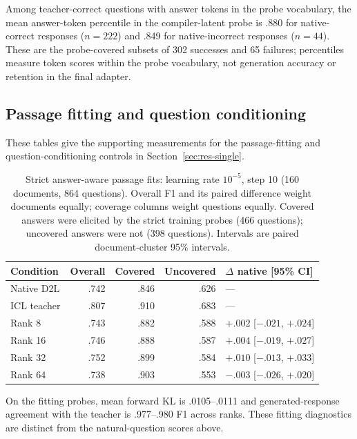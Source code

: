 Among teacher-correct questions with answer tokens in the probe vocabulary,
the mean answer-token percentile in the compiler-latent probe is .880 for
native-correct responses ($n=222$) and .849 for native-incorrect responses
($n=44$). These are the probe-covered subsets of 302 successes and 65 failures;
percentiles measure token scores within the probe vocabulary, not generation
accuracy or retention in the final adapter.

\subsection{Passage fitting and question conditioning}
\label{sec:res-refinement}
These tables give the supporting measurements for the passage-fitting and
question-conditioning controls in Section~\ref{sec:res-single}.

\begin{table}[t]
\centering
\caption{Strict answer-aware passage fits: learning rate $10^{-5}$, step 10
(160 documents, 864 questions). Overall F1 and its paired difference weight
documents equally; coverage columns weight questions equally. Covered answers
were elicited by the strict training probes (466 questions); uncovered answers
were not (398 questions). Intervals are paired document-cluster 95\% intervals.}
\label{tab:refinement}
\scriptsize\setlength{\tabcolsep}{2pt}
\begin{tabular}{@{}lrrrl@{}}
\toprule
Condition & Overall & Covered & Uncovered & $\Delta$ native [95\% CI] \\
\midrule
Native D2L & .742 & .846 & .626 & --- \\
ICL teacher & .807 & .910 & .683 & --- \\
\midrule
Rank 8 & .743 & .882 & .588 & $+.002$ [$-.021$, $+.024$] \\
Rank 16 & .746 & .888 & .587 & $+.004$ [$-.019$, $+.027$] \\
Rank 32 & .752 & .899 & .584 & $+.010$ [$-.013$, $+.033$] \\
Rank 64 & .738 & .903 & .553 & $-.003$ [$-.026$, $+.020$] \\
\bottomrule
\end{tabular}
\par\smallskip
\raggedright On the fitting probes, mean forward KL is .0105--.0111 and
generated-response agreement with the teacher is .977--.980 F1 across ranks.
These fitting diagnostics are distinct from the natural-question scores above.
\end{table}

